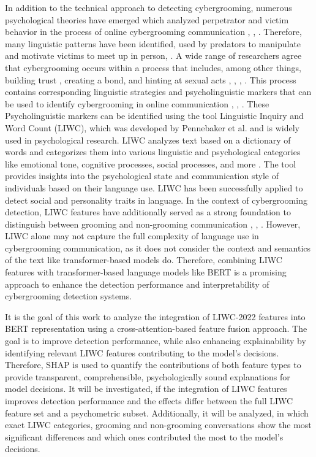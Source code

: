 In addition to the technical approach to detecting cybergrooming, numerous psychological theories have emerged which analyzed perpetrator and victim behavior in the process of online cybergrooming communication \cite{black2015linguistic}, \cite{lorenzo2016understanding}, \cite{oconnell2003typology}. Therefore, many linguistic patterns have been identified, used by predators to manipulate and motivate victims to meet up in person\cite{chiangandgrant2017online}, \cite{lorenzudus2017cause}. A wide range of researchers agree that cybergrooming occurs within a process that includes, among other things, building trust , creating a bond, and hinting at sexual acts \cite{oconnell2003typology}, \cite{lorenzudus2017cause}, \cite{williamsmodel}, \cite{chiangandgrant2017online} . This process contains corresponding linguistic strategies and psycholinguistic markers that can be used to identify cybergrooming in online communication \cite{black2015linguistic}, \cite{guo2023text}, \cite{broome2020psycholinguistic}. These Psycholinguistic markers can be identified using the tool Linguistic Inquiry and Word Count (LIWC), which was developed by Pennebaker et al. \cite{pennebaker2022liwc} and is widely used in psychological research. LIWC analyzes text based on a dictionary of words and categorizes them into various linguistic and psychological categories like emotional tone, cognitive processes, social processes, and more \cite{pennebaker2022liwc}. The tool provides insights into the psychological state and communication style of individuals based on their language use. LIWC has been successfully applied to detect social and personality traits in language\cite{tausczik2010psychological}. In the context of cybergrooming detection, LIWC features have additionally served as a strong foundation to distinguish between grooming and non-grooming communication \cite{broome2020psycholinguistic}, \cite{guo2023text}, \cite{gupta2012characterizingpedophileconversationsinternet}. However, LIWC alone may not capture the full complexity of language use in cybergrooming communication, as it does not consider the context and semantics of the text like transformer-based models do. Therefore, combining LIWC features with transformer-based language models like BERT is a promising approach to enhance the detection performance and interpretability of cybergrooming detection systems.

It is the goal of this work to analyze the integration of LIWC-2022 features into BERT representation using a cross-attention-based feature fusion approach. The goal is to improve detection performance, while also enhancing explainability by identifying relevant LIWC features contributing to the model's decisions. Therefore, SHAP \cite{lundberg2017shap} is used to quantify the contributions of both feature types to provide transparent, comprehensible, psychologically sound explanations for model decisions. It will be investigated, if the integration of LIWC features improves detection performance and the effects differ between the full LIWC feature set and a psychometric subset. Additionally, it will be analyzed, in which exact LIWC categories, grooming and non-grooming conversations show the most significant differences and which ones contributed the most to the model's decisions.

